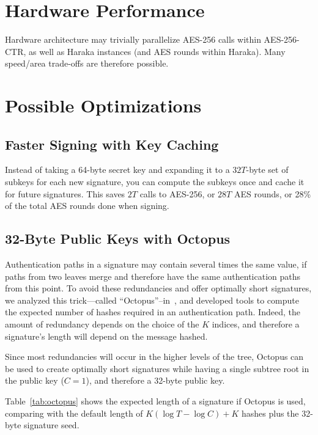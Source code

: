 \section{Hardware Performance}

Hardware architecture may trivially parallelize AES-256 calls within AES-256-CTR, as well as Haraka instances (and AES rounds within Haraka).
Many speed/area trade-offs are therefore possible.


\section{Possible Optimizations}

\subsection{Faster Signing with Key Caching}\label{ssec:cache}

Instead of taking a 64-byte secret key and expanding it to a $32T$-byte set of subkeys for each new signature, you can compute the subkeys once and cache it for future signatures. 
This saves $2T$ calls to AES-256, or $28T$ AES rounds, or 28\% of the total AES rounds done when signing.


\subsection{32-Byte Public Keys with Octopus}

Authentication paths in a signature may contain several times the same value, if paths from two leaves merge and therefore have the same authentication paths from this point.
To avoid these redundancies and offer optimally short signatures, we analyzed this trick---called ``Octopus''--in~\cite[Ch.5]{masters}, and developed tools to compute the expected number of hashes required in an authentication path.
Indeed, the amount of redundancy depends on the choice of the $K$ indices, and therefore a signature's length will depend on the message hashed.

Since most redundancies will occur in the higher levels of the tree, Octopus can be used to create optimally short signatures while having a single subtree root in the public key ($C=1$), and therefore a 32-byte public key.

Table~\ref{tab:octopus} shows the expected length of a signature if Octopus is used, comparing with the default length of $K(\log T - \log C)+K$ hashes plus the 32-byte signature seed.

